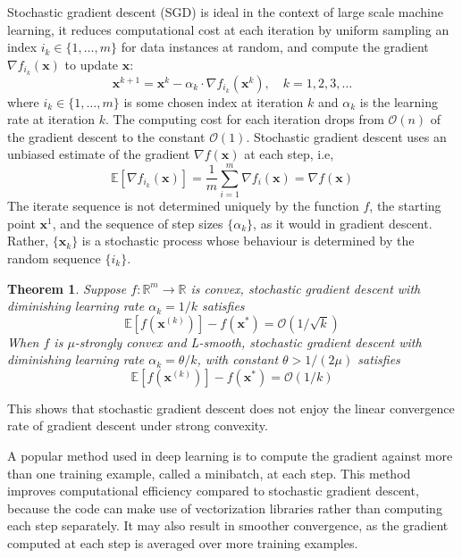 \documentclass[12pt]{report}
\newtheorem{thm}{Theorem}[section]
\numberwithin{equation}{section}
\begin{document}
Stochastic gradient descent (SGD) {\cite{robbins1951stochastic}} is ideal in the context of large scale machine learning, it reduces computational cost at each iteration by uniform sampling an index $i_k \in\{1, \ldots, m\}$ for data instances at random, and compute the gradient $\nabla f_{i_{k}}(\bm{x})$ to update $\bm{x}$:
\begin{equation}\label{eqn:sgd}
\bm{x}^{k+1}=\bm{x}^{k}- \alpha_k \cdot \nabla f_{i_{k}}\left(\bm{x}^{k}\right), \quad k=1,2,3, \ldots
\end{equation}
where $i_{k} \in\{1, \ldots, m\}$ is some chosen index at iteration $k$ and $\alpha_k$ is the learning rate at iteration $k$. The computing cost for each iteration drops from $\mathcal{O}(n)$ of the gradient descent to the constant $\mathcal{O}(1)$. Stochastic gradient descent uses an unbiased estimate of the gradient $\nabla f(\bm{x})$ at each step, i.e,
\begin{equation}\label{eqn:sgd_est}
\mathbb{E}[\nabla f_{i_{k}}(\bm{x})]=\frac{1}{m} \sum_{i=1}^{m} \nabla f_{i}(\bm{x})  = \nabla f(\bm{x})
\end{equation}
The iterate sequence is not determined uniquely by the function $f$, the starting point $\bm{x}^1$, and the sequence of step sizes $\{\alpha_k\}$, as it would in gradient descent. Rather, $\{\bm{x}_k\}$ is a stochastic process whose behaviour is determined by the random sequence $\{i_k\}$.
\begin{thm}
Suppose $f:\mathbb{R}^m\rightarrow\mathbb{R}$ is convex, stochastic gradient descent with diminishing learning rate $\alpha_k = 1/k$ satisfies
\[
\mathbb{E}[f(\bm{x}^{(k)})] - f(\bm{x}^*) = \mathcal{O}(1/\sqrt{k})
\]
When $f$ is $\mu$-strongly convex and L-smooth, stochastic gradient descent with diminishing learning rate $\alpha_k = \theta/k$, with constant $\theta > 1/(2\mu)$ satisfies
\[
\mathbb{E}[f(\bm{x}^{(k)})] - f(\bm{x}^*) = \mathcal{O}(1/k)
\]
\end{thm}
\noindent
This shows that stochastic gradient descent does not enjoy the linear convergence rate of gradient descent under strong convexity.

A popular method used in deep learning is to 
compute the gradient against more than one training example, called a minibatch, at each step. This method improves computational efficiency compared to stochastic gradient descent, because the code can make use of vectorization libraries rather than computing each step separately. It may also result in smoother convergence, as the gradient computed at each step is averaged over more training examples. 
\end{document}
